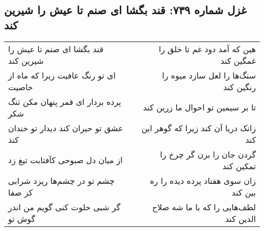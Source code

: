 \begin{center}
\section*{غزل شماره ۷۳۹: قند بگشا ای صنم تا عیش را شیرین کند}
\label{sec:0739}
\begin{longtable}{l p{0.5cm} r}
قند بگشا ای صنم تا عیش را شیرین کند
&&
هین که آمد دود غم تا خلق را غمگین کند
\\
ای تو رنگ عافیت زیرا که ماه از خاصیت
&&
سنگ‌ها را لعل سازد میوه را رنگین کند
\\
پرده بردار ای قمر پنهان مکن تنگ شکر
&&
تا بر سیمین تو احوال ما زرین کند
\\
عشق تو حیران کند دیدار تو خندان کند
&&
زانک دریا آن کند زیرا که گوهر این کند
\\
از میان دل صبوحی کآفتابت تیغ زد
&&
گردن جان را بزن گر چرخ را تمکین کند
\\
چشم تو در چشم‌ها ریزد شرابی کز صفا
&&
زان سوی هفتاد پرده دیده را ره بین کند
\\
گر شبی خلوت کنی گویم من اندر گوش تو
&&
لطف‌هایی را که با ما شه صلاح الدین کند
\\
\end{longtable}
\end{center}
